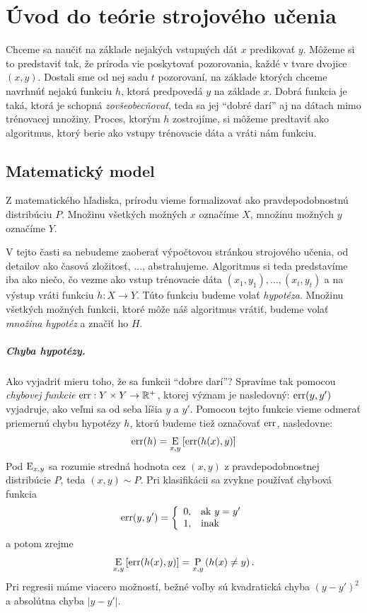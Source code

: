 \chapter{Úvod do teórie strojového učenia}

Chceme sa naučiť na základe nejakých vstupných dát $x$ predikovať $y$.
Môžeme si to predstaviť tak, že príroda vie poskytovať pozorovania,
každé v tvare dvojice $(x, y)$. Dostali sme od nej sadu $t$ pozorovaní,
na základe ktorých chceme navrhnúť nejakú funkciu $h$, ktorá predpovedá
$y$ na základe $x$. Dobrá funkcia je taká, ktorá je schopná
\emph{zovšeobecňovať}, teda sa jej ``dobré darí'' aj na dátach mimo
trénovacej množiny. Proces, ktorým $h$ zostrojíme, si môžeme predtaviť
ako algoritmus, ktorý berie ako vstupy trénovacie dáta a vráti nám
funkciu.




\section{Matematický model}

Z matematického hľadiska, prírodu vieme formalizovať ako
pravdepodobnostnú distribúciu $P$. Množinu všetkých možných
$x$ označíme $X$, množinu možných $y$ označíme $Y$.

V tejto časti sa nebudeme zaoberať výpočtovou stránkou strojového
učenia, od detailov ako časová zložitosť, ..., abstrahujeme. Algoritmus
si teda predstavíme iba ako niečo, čo vezme ako vstup trénovacie dáta
$(x_1, y_1), \ldots, (x_t, y_t)$ a na výstup vráti funkciu
$h : X \to Y$. Túto funkciu budeme volať \emph{hypotéza}. Množinu
všetkých možných funkcii, ktoré môže náš algoritmus vrátiť,
budeme volať \emph{množina hypotéz} a značiť ho $H$.

\paragraph{Chyba hypotézy.}
Ako vyjadriť mieru toho, že sa funkcii ``dobre darí''? Spravíme tak
pomocou \emph{chybovej funkcie} $\mathrm{err} : Y \times Y \to \mathbb{R}^+$,
ktorej význam je nasledovný: $\mathrm{err}(y, y')$ vyjadruje, ako veľmi
sa od seba líšia $y$ a $y'$. Pomocou tejto funkcie vieme odmerať
priemernú chybu hypotézy $h$, ktorú budeme tiež označovať $\mathrm{err}$,
nasledovne:
$$\mathrm{err}(h) = \operatorname*{\mathrm{E}}_{x, y} \left[ \mathrm{err}(h(x), y) \right]$$
Pod $\operatorname*{\mathrm{E}}_{x, y}$ sa rozumie stredná hodnota cez $(x, y)$
z pravdepodobnostnej distribúcie $P$, teda $(x, y) \sim P$.
Pri klasifikácii sa zvykne používať chybová funkcia
$$
  \mathrm{err}(y, y') = \left\{
    \begin{array}{ll}
      0, & \text{ak}\ y = y' \\
      1, & \text{inak}
    \end{array}
  \right.
$$
a potom zrejme
$$\operatorname*{\mathrm{E}}_{x, y} \left[ \mathrm{err}(h(x), y) \right] = \operatorname*{\mathrm{P}}_{x, y} \left( h(x) \neq y \right).$$
Pri regresii máme viacero možností, bežné voľby sú kvadratická chyba
$(y - y')^2$ a absolútna chyba $|y - y'|$.

